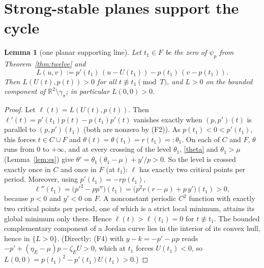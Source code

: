 \documentclass[11pt,a4paper]{article}
\newtheorem{lemma}[theorem]{Lemma}
\theoremstyle{remark}\newtheorem{remark}[theorem]{Remark}
\newcommand{\R}{\mathbb R}
\begin{document}
\section{Strong-stable planes support the cycle}
\begin{lemma}[one planar supporting line]\label{lem:line}
Let $t_1\in F$ be the zero of $\psi_p$ from Theorem~\ref{thm:twelve} and
\[
L(u,v):=p'(t_1)\,(u-U(t_1))-p(t_1)\,(v-p(t_1)).
\]
Then $L(U(t),p(t))>0$ for all $t\not\equiv t_1\pmod T$, and $L>0$ on the bounded component of
$\R^2\setminus\gamma_\pi$; in particular $L(0,0)>0$.
\end{lemma}
\begin{proof}
Let $\ell(t)=L(U(t),p(t))$. Then $\ell'(t)=p'(t_1)p(t)-p(t_1)p'(t)$ vanishes exactly when
$(p,p')(t)$ is parallel to $(p,p')(t_1)$ (both are nonzero by (F2)). As $p(t_1)<0<p'(t_1)$,
this forces $t\in C\cup F$ and $\theta(t)=\theta(t_1)=r(t_1)=:\theta_1$. On each of $C$ and $F$,
$\theta$ runs from $0$ to $+\infty$, and at every crossing of the level $\theta_1$,
\eqref{theta} and $\theta_1>\mu$ (Lemma~\ref{lem:es}) give $\theta'=\theta_1(\theta_1-\mu)+y'/p>0$.
So the level is crossed exactly once in $C$ and once in $F$ (at $t_1$): $\ell$ has exactly two
critical points per period. Moreover, using $p'(t_1)=-r p(t_1)$,
\[
\ell''(t_1)=\bigl(p'^2-pp''\bigr)(t_1)=\bigl(p^2r(r-\mu)+p\,y'\bigr)(t_1)>0,
\]
because $p<0$ and $y'<0$ on $F$. A nonconstant periodic $C^2$ function with exactly two critical
points per period, one of which is a strict local minimum, attains its global minimum only
there. Hence $\ell(t)>\ell(t_1)=0$ for $t\not\equiv t_1$. The bounded complementary component of
a Jordan curve lies in the interior of its convex hull, hence in $\{L>0\}$.
(Directly: (F4) with $y-k=-p'-\mu p$ reads $-p'+(\eta_E-\mu)p-\zeta_EU>0$, which at $t_1$ forces
$U(t_1)<0$, so $L(0,0)=p(t_1)^2-p'(t_1)U(t_1)>0$.)
\end{proof}
\end{document}
